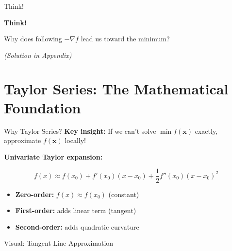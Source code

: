 \documentclass[aspectratio=169,11pt]{beamer}
\newcommand{\grad}{\nabla}
\newcommand{\vx}{\bm{x}}
\begin{document}
\begin{frame}{Think!}
\begin{center}
\Large \textbf{Think!}
\end{center}

Why does following $-\grad f$ lead us toward the minimum?

\pause
\vspace{1cm}
\textit{(Solution in Appendix)}
\end{frame}

\section{Taylor Series: The Mathematical Foundation}

\begin{frame}{Why Taylor Series?}
\textbf{Key insight:} If we can't solve $\min f(\vx)$ exactly, approximate $f(\vx)$ locally!

\pause
\textbf{Univariate Taylor expansion:}
\begin{center}
\Large
\[f(x) \approx f(x_0) + f'(x_0)(x-x_0) + \frac{1}{2}f''(x_0)(x-x_0)^2\]
\end{center}

\pause
\begin{itemize}
\item \textbf{Zero-order:} $f(x) \approx f(x_0)$ (constant)
\item \textbf{First-order:} adds linear term (tangent)
\item \textbf{Second-order:} adds quadratic curvature
\end{itemize}
\end{frame}

\begin{frame}{Visual: Tangent Line Approximation}
\begin{center}
\end{center}
\end{frame}
\end{document}
